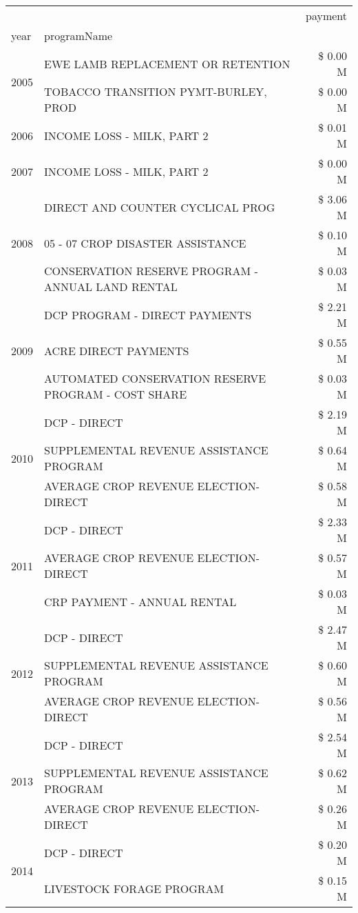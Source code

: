 \begin{tabular}{llr}
\toprule
 &  & payment \\
year & programName &  \\
\midrule
\multirow[t]{2}{*}{2005} & EWE LAMB REPLACEMENT OR RETENTION & \$ 0.00 M \\
 & TOBACCO TRANSITION PYMT-BURLEY, PROD & \$ 0.00 M \\
\cline{1-3}
2006 & INCOME LOSS - MILK, PART 2 & \$ 0.01 M \\
\cline{1-3}
2007 & INCOME LOSS - MILK, PART 2 & \$ 0.00 M \\
\cline{1-3}
\multirow[t]{3}{*}{2008} & DIRECT AND COUNTER CYCLICAL PROG & \$ 3.06 M \\
 & 05 - 07 CROP DISASTER ASSISTANCE & \$ 0.10 M \\
 & CONSERVATION RESERVE PROGRAM - ANNUAL LAND RENTAL & \$ 0.03 M \\
\cline{1-3}
\multirow[t]{3}{*}{2009} & DCP PROGRAM - DIRECT PAYMENTS & \$ 2.21 M \\
 & ACRE DIRECT PAYMENTS & \$ 0.55 M \\
 & AUTOMATED CONSERVATION RESERVE PROGRAM - COST SHARE & \$ 0.03 M \\
\cline{1-3}
\multirow[t]{3}{*}{2010} & DCP - DIRECT & \$ 2.19 M \\
 & SUPPLEMENTAL REVENUE ASSISTANCE PROGRAM & \$ 0.64 M \\
 & AVERAGE CROP REVENUE ELECTION-DIRECT & \$ 0.58 M \\
\cline{1-3}
\multirow[t]{3}{*}{2011} & DCP - DIRECT & \$ 2.33 M \\
 & AVERAGE CROP REVENUE ELECTION-DIRECT & \$ 0.57 M \\
 & CRP PAYMENT - ANNUAL RENTAL & \$ 0.03 M \\
\cline{1-3}
\multirow[t]{3}{*}{2012} & DCP - DIRECT & \$ 2.47 M \\
 & SUPPLEMENTAL REVENUE ASSISTANCE PROGRAM & \$ 0.60 M \\
 & AVERAGE CROP REVENUE ELECTION-DIRECT & \$ 0.56 M \\
\cline{1-3}
\multirow[t]{3}{*}{2013} & DCP - DIRECT & \$ 2.54 M \\
 & SUPPLEMENTAL REVENUE ASSISTANCE PROGRAM & \$ 0.62 M \\
 & AVERAGE CROP REVENUE ELECTION-DIRECT & \$ 0.26 M \\
\cline{1-3}
\multirow[t]{3}{*}{2014} & DCP - DIRECT & \$ 0.20 M \\
 & LIVESTOCK FORAGE PROGRAM & \$ 0.15 M \\

\end{tabular}
